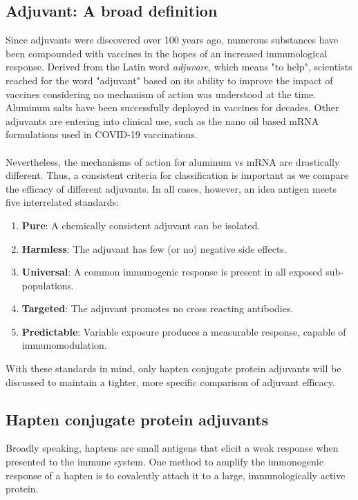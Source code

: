\documentclass[a4paper]{article}
\begin{document}
\subsection{Adjuvant: A broad definition}
Since adjuvants were discovered over 100 years ago, numerous substances have been compounded with vaccines in the hopes of an increased immunological response. Derived from the Latin word \emph{adjuvare}, which means "to help"\cite{pmid9139482}, scientists reached for the word "adjuvant" based on its ability to improve the impact of vaccines considering no mechanism of action was understood at the time. Aluminum salts have been successfully deployed in vaccines for decades\cite{pmid27274998}. Other adjuvants are entering into clinical use, such as the nano oil based mRNA formulations used in COVID-19 vaccinations\cite{pmid33034449}. \\\\ Nevertheless, the mechanisms of action for aluminum vs mRNA are drastically different. Thus, a consistent criteria for classification is important as we compare the efficacy of different adjuvants. In all cases, however, an idea antigen meets five interrelated standards\cite{pmid24833186}: 

\begin{enumerate}
    \item \textbf{Pure}: A chemically consistent adjuvant can be isolated.
    \item \textbf{Harmless}: The adjuvant has few (or no) negative side effects.
    \item \textbf{Universal}: A common immunogenic response is present in all exposed sub-populations. 
    \item \textbf{Targeted}: The adjuvant promotes no cross reacting antibodies. 
    \item \textbf{Predictable}: Variable exposure produces a measurable response, capable of immunomodulation.
\end{enumerate}

With these standards in mind, only hapten conjugate protein adjuvants will be discussed to maintain a tighter, more specific comparison of adjuvant efficacy. 
\subsection{Hapten conjugate protein adjuvants}
Broadly speaking, haptens are small antigens that elicit a weak response when presented to the immune system\cite{pmid30275080}. One method to amplify the  immonogenic response of a hapten is to covalently attach it to a large, immunologically active protein. 


\printbibliography[]
\end{document}
